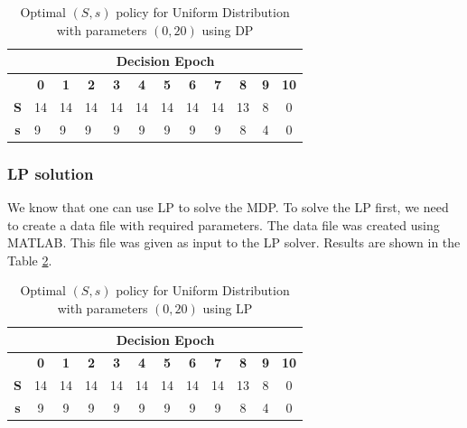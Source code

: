 \documentclass[11pt,a4paper,oneside]{report}
\begin{document}
\begin{table}[]
\centering
\caption{Optimal $(S,s)$ policy for Uniform Distribution with parameters $(0,20)$ using DP}
\label{t2}
\begin{tabular}{|c|c|c|c|c|c|c|c|c|c|c|c|}
\hline
           & \multicolumn{11}{c|}{\textbf{Decision Epoch}}                                                                                                                                     \\ \hline
\textbf{}  & \textbf{0}             & \textbf{1}             & \textbf{2}             & \textbf{3} & \textbf{4} & \textbf{5} & \textbf{6} & \textbf{7} & \textbf{8} & \textbf{9} & \textbf{10} \\ \hline
\textbf{S} & 14                     & 14                     & 14                     & 14         & 14         & 14         & 14         & 14         & 13         & 8          & 0           \\ \hline
\textbf{s} & \multicolumn{1}{l|}{9} & \multicolumn{1}{l|}{9} & \multicolumn{1}{l|}{9} & 9          & 9          & 9          & 9          & 9          & 8          & 4          & 0           \\ \hline
\end{tabular}
\end{table}
\subsubsection{LP solution}
We know that one can use LP to solve the MDP. To solve the LP first, we need to create a data file with required parameters. The data file was created using MATLAB. This file was given as input to the LP solver. Results are shown in the Table \ref{t3}.
\begin{table}[]
\centering
\caption{Optimal $(S,s)$ policy for Uniform Distribution with parameters $(0,20)$ using LP}
\label{t3}
\begin{tabular}{|c|c|c|c|c|c|c|c|c|c|c|c|}
\hline
           & \multicolumn{11}{c|}{\textbf{Decision Epoch}}                                                                                                 \\ \hline
\textbf{}  & \textbf{0} & \textbf{1} & \textbf{2} & \textbf{3} & \textbf{4} & \textbf{5} & \textbf{6} & \textbf{7} & \textbf{8} & \textbf{9} & \textbf{10} \\ \hline
\textbf{S} & 14         & 14         & 14         & 14         & 14         & 14         & 14         & 14         & 13         & 8          & 0           \\ \hline
\textbf{s} & 9          & 9          & 9          & 9          & 9          & 9          & 9          & 9          & 8          & 4          & 0           \\ \hline
\end{tabular}
\end{table}
\end{document}
